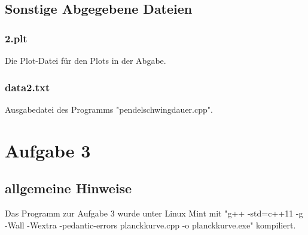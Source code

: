 \documentclass{scrreprt}
\begin{document}
\section*{Sonstige Abgegebene Dateien}
\subsection*{2.plt}
Die Plot-Datei für den Plots in der Abgabe.
\subsection*{data2.txt}
Ausgabedatei des Programms "pendelschwingdauer.cpp".

\chapter*{Aufgabe 3}
\section*{allgemeine Hinweise}
Das Programm zur Aufgabe 3 wurde unter Linux Mint mit "g++ -std=c++11 -g -Wall -Wextra -pedantic-errors planckkurve.cpp -o planckkurve.exe" kompiliert.
\end{document}
